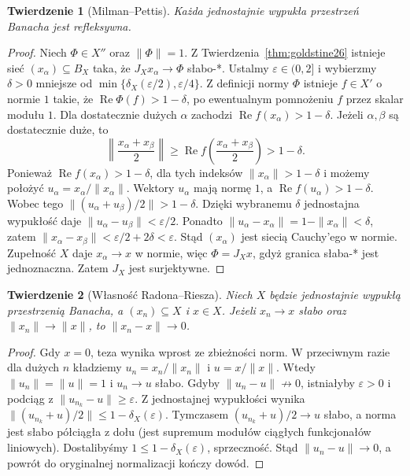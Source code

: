 \documentclass[11pt,a4paper]{article}
\numberwithin{equation}{section}
\theoremstyle{plain}
\newtheorem{twierdzenie}{Twierdzenie}[section]
\theoremstyle{definition}
\theoremstyle{remark}
\begin{document}
\begin{twierdzenie}[Milman--Pettis]
\label{thm:milman-pettis26}
Każda jednostajnie wypukła przestrzeń Banacha jest refleksywna.
\end{twierdzenie}
\begin{proof}
Niech $\Phi\in X''$ oraz $\|\Phi\|=1$.
Z Twierdzenia~\ref{thm:goldstine26} istnieje sieć
$(x_\alpha)\subseteq B_X$ taka, że
$J_Xx_\alpha\to\Phi$ słabo-*.
Ustalmy $\varepsilon\in(0,2]$ i wybierzmy
$\delta>0$ mniejsze od $\min\{\delta_X(\varepsilon/2),\varepsilon/4\}$.
Z definicji normy $\Phi$ istnieje $f\in X'$ o normie $1$
takie, że $\operatorname{Re}\Phi(f)>1-\delta$,
po ewentualnym pomnożeniu $f$ przez skalar modułu $1$.
Dla dostatecznie dużych $\alpha$ zachodzi
$\operatorname{Re}f(x_\alpha)>1-\delta$.
Jeżeli $\alpha,\beta$ są dostatecznie duże, to
\[
\left\|\frac{x_\alpha+x_\beta}{2}\right\|
\ge\operatorname{Re}f\left(\frac{x_\alpha+x_\beta}{2}\right)
>1-\delta.
\]
Ponieważ $\operatorname{Re}f(x_\alpha)>1-\delta$, dla tych
indeksów $\|x_\alpha\|>1-\delta$ i możemy położyć
$u_\alpha=x_\alpha/\|x_\alpha\|$. Wektory $u_\alpha$
mają normę $1$, a $\operatorname{Re}f(u_\alpha)>1-\delta$.
Wobec tego $\|(u_\alpha+u_\beta)/2\|>1-\delta$.
Dzięki wybranemu $\delta$ jednostajna wypukłość daje
$\|u_\alpha-u_\beta\|<\varepsilon/2$.
Ponadto $\|u_\alpha-x_\alpha\|=1-\|x_\alpha\|<\delta$,
zatem $\|x_\alpha-x_\beta\|<\varepsilon/2+2\delta<\varepsilon$.
Stąd $(x_\alpha)$ jest siecią Cauchy'ego w normie.
Zupełność $X$ daje $x_\alpha\to x$ w normie, więc
$\Phi=J_Xx$, gdyż granica słaba-* jest jednoznaczna.
Zatem $J_X$ jest surjektywne.
\end{proof}

\begin{twierdzenie}[Własność Radona--Riesza]
\label{thm:radon-riesz26}
Niech $X$ będzie jednostajnie wypukłą przestrzenią Banacha,
a $(x_n)\subseteq X$ i $x\in X$. Jeżeli $x_n\to x$
słabo oraz $\|x_n\|\to\|x\|$, to $\|x_n-x\|\to0$.
\end{twierdzenie}
\begin{proof}
Gdy $x=0$, teza wynika wprost ze zbieżności norm.
W przeciwnym razie dla dużych $n$ kładziemy
$u_n=x_n/\|x_n\|$ i $u=x/\|x\|$.
Wtedy $\|u_n\|=\|u\|=1$ i $u_n\to u$ słabo.
Gdyby $\|u_n-u\|\not\to0$, istniałyby
$\varepsilon>0$ i podciąg z $\|u_{n_k}-u\|\ge\varepsilon$.
Z jednostajnej wypukłości wynika
$\|(u_{n_k}+u)/2\|\le1-\delta_X(\varepsilon)$.
Tymczasem $(u_{n_k}+u)/2\to u$ słabo, a norma jest
słabo półciągła z dołu (jest supremum modułów
ciągłych funkcjonałów liniowych).
Dostalibyśmy $1\le1-\delta_X(\varepsilon)$,
sprzeczność. Stąd $\|u_n-u\|\to0$, a powrót do
oryginalnej normalizacji kończy dowód.
\end{proof}
\end{document}
